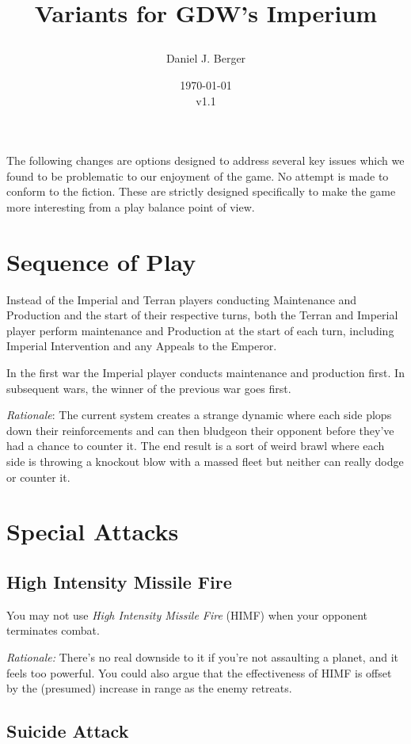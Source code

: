 \documentclass[a4paper,11pt]{article}
\title{%
  Variants for GDW's Imperium  \\
  \vspace{0.5em}
  \date{\today\\v1.1}
}
\author{Daniel J. Berger}
\begin{document}
\maketitle

The following changes are options designed to address several key issues which we found to be problematic to our enjoyment of the game. No attempt is made to conform to the fiction. These are strictly designed specifically to make the game more interesting from a play balance point of view.

\section{Sequence of Play}

Instead of the Imperial and Terran players conducting Maintenance and Production and the start of their respective turns, both the Terran and Imperial player perform maintenance and Production at the start of each turn, including Imperial Intervention and any Appeals to the Emperor.

In the first war the Imperial player conducts maintenance and production first. In subsequent wars, the winner of the previous war goes first.

\textit{Rationale}: The current system creates a strange dynamic where each side plops down their reinforcements and can then bludgeon their opponent before they've had a chance to counter it. The end result is a sort of weird brawl where each side is throwing a knockout blow with a massed fleet but neither can really dodge or counter it.

\section{Special Attacks}

\subsection{High Intensity Missile Fire}

You may not use \textit{High Intensity Missile Fire} (HIMF) when your opponent terminates combat.

\textit{Rationale:} There's no real downside to it if you're not assaulting a planet, and it feels too powerful. You could also argue that the effectiveness of HIMF is offset by the (presumed) increase in range as the enemy retreats.

\subsection{Suicide Attack}
\end{document}

